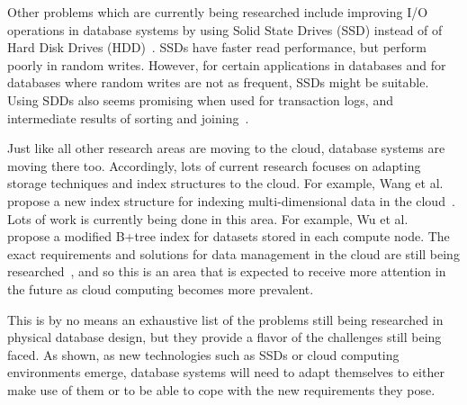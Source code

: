 \documentclass[12pt,a4paper]{article}
\begin{document}
Other problems which are currently being researched include improving I/O operations in database systems by using Solid State Drives (SSD) instead of of Hard
Disk Drives (HDD)~\cite{lee2009, du2009, lee2008}. SSDs have faster read performance, but perform poorly in random writes. However, for certain applications in
databases and for databases where random writes are not as frequent, SSDs might be suitable. Using SDDs also seems promising when used for
transaction logs, and intermediate results of sorting and joining~\cite{lee2008}.

Just like all other research areas are moving to the cloud, database systems are moving there too. Accordingly, lots of current research focuses on adapting
storage techniques and index structures to the cloud. For example, Wang et al. propose a new index structure for indexing multi-dimensional data in the
cloud~\cite{wang2010indexing}. Lots of work is currently being done in this area. For example, Wu et al.~\cite{wu2010efficient} propose a modified B+tree index
for datasets stored in each compute node. The exact requirements and solutions for data management in the cloud are still being
researched~\cite{abadi2009data}, and so this is an area that is expected to receive more attention in the future as cloud computing becomes more prevalent.


This is by no means an exhaustive list of the problems still being researched in physical database design, but they provide a flavor of the challenges still
being faced. As shown, as new technologies such as SSDs or cloud computing environments emerge, database systems will need to adapt themselves to either make
use of them or to be able to cope with the new requirements they pose. 
\end{document}
